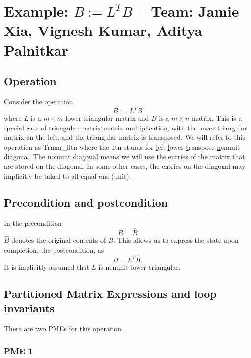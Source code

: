 \chapter{Example: $ B := L^T B $ --  \large Team: Jamie Xia, Vignesh Kumar, Aditya Palnitkar}



\section{Operation}

Consider the operation
\[
B := L^T B 
\]
where $ L $ is a $ m \times m $ lower triangular matrix and $ B $ is a $ m \times n $ matrix.
This is a special case of triangular 
matrix-matrix multiplication, 
with the {\sc l}ower triangular matrix on the {\sc l}eft, 
and the triangular matrix is transposed.
We will refer to this operation
as {\sc Trmm\_lltn} where the {\sc lltn} stands for
\underline{l}eft
\underline{l}ower
\underline{t}ranspose
\underline{n}onunit diagonal.
The {\sc n}onunit diagonal means we will use the entries of the matrix that are stored on the diagonal.  In some other cases, the entries on the diagonal may implicitly be taked to all equal one ({\sc u}nit).

\section{Precondition and postcondition}

In the precondition 
\[
B = \widehat B
\]
$ \widehat B $ denotes the original contents of $ B $.
This allows us to express the state upon completion, the postcondition, as
\[
B = L^T \widehat B.
\]
It is implicitly assumed that $ L $ is nonunit lower triangular.
\section{Partitioned Matrix Expressions and loop invariants}

There are two PMEs for this operation.

\subsection{PME 1}

